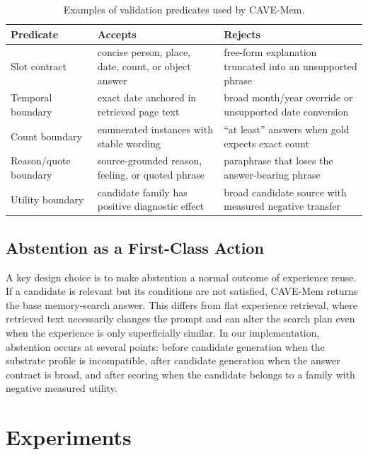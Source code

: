 \documentclass[conference]{IEEEtran}
\newcommand{\method}{CAVE-Mem}
\begin{document}
\begin{table}[t]
\caption{Examples of validation predicates used by \method{}.}
\label{tab:predicates}
\centering
\scriptsize
\setlength{\tabcolsep}{1.8pt}
\begin{tabular}{p{}p{}p{}}
\toprule
Predicate & Accepts & Rejects \\
\midrule
Slot contract & concise person, place, date, count, or object answer & free-form
explanation truncated into an unsupported phrase \\
Temporal boundary & exact date anchored in retrieved page text & broad
month/year override or unsupported date conversion \\
Count boundary & enumerated instances with stable wording & ``at least''
answers when gold expects exact count \\
Reason/quote boundary & source-grounded reason, feeling, or quoted phrase &
paraphrase that loses the answer-bearing phrase \\
Utility boundary & candidate family has positive diagnostic effect & broad
candidate source with measured negative transfer \\
\bottomrule
\end{tabular}
\end{table}

\subsection{Abstention as a First-Class Action}
A key design choice is to make abstention a normal outcome of experience
reuse. If a candidate is relevant but its conditions are not satisfied,
\method{} returns the base memory-search answer. This differs from flat
experience retrieval, where retrieved text necessarily changes the prompt and
can alter the search plan even when the experience is only superficially
similar. In our implementation, abstention occurs at several points: before
candidate generation when the substrate profile is incompatible, after
candidate generation when the answer contract is broad, and after scoring when
the candidate belongs to a family with negative measured utility.

\section{Experiments}
\end{document}
